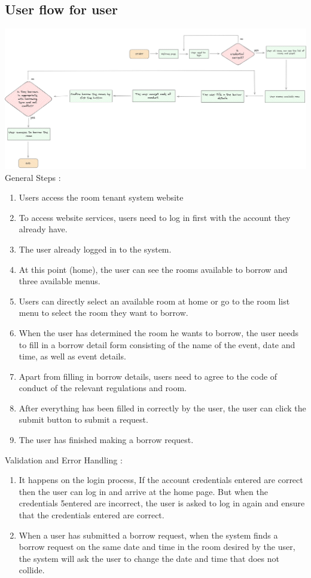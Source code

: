 \documentclass[12pt,titlepage,a4paper]{report}
\begin{document}
    \subsection{User flow for user}
    \noindent
    \includegraphics[width=\textwidth]{images/figures/UIUX/Untitled 5.png}
    General Steps :
    \begin{enumerate}
        \item Users access the room tenant system website
        \item To access website services, users need to log in first with the account they already have.
        \item The user already logged in to the system.
        \item At this point (home), the user can see the rooms available to borrow and three available menus.
        \item Users can directly select an available room at home or go to the room list menu to select the room they want to borrow.
        \item When the user has determined the room he wants to borrow, the user needs to fill in a borrow detail form consisting of the name of the event, date and time, as well as event details.
        \item Apart from filling in borrow details, users need to agree to the code of conduct of the relevant regulations and room.
        \item After everything has been filled in correctly by the user, the user can click the submit button to submit a request.
        \item The user has finished making a borrow request.
    \end{enumerate}
    Validation and Error Handling :
    \begin{enumerate}
        \item It happens on the login process, If the account credentials entered are correct then the user can log in and arrive at the home page. But when the credentials 5entered are incorrect, the user is asked to log in again and ensure that the credentials entered are correct.
        \item When a user has submitted a borrow request, when the system finds a borrow request on the same date and time in the room desired by the user, the system will ask the user to change the date and time that does not collide.
    \end{enumerate}
\end{document}
